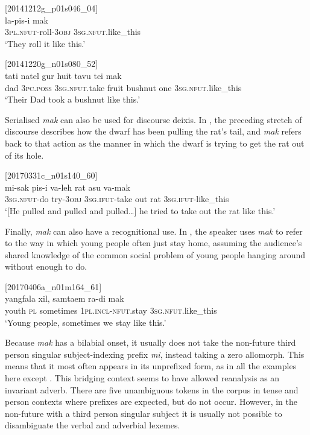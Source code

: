 \documentclass[output=paper,colorlinks,citecolor=brown]{langscibook}
\begin{document}
\ea
{\label{ex:ridge:57}[20141212g\_p01s046\_04]}\\
\gll la-pis-i      mak\\
     \textsc{3pl.nfut-}roll-\textsc{3obj}  \textsc{3sg.nfut.}like\_this\\
\glt ‘They roll it like this.’
\z

\ea
{\label{ex:ridge:58}[20141220g\_n01s080\_52]}\\
\gll tati  natel    gur      huit  tavu    tei  mak\\
     dad   \textsc{3pc.poss}   \textsc{3sg.nfut.}take   fruit   bushnut one   \textsc{3sg.nfut}.like\_this\\
\glt ‘Their Dad took a bushnut like this.’
\z

Serialised \textit{mak} can also be used for discourse deixis. In , the preceding stretch of discourse describes how the dwarf has been pulling the rat’s tail, and \textit{mak} refers back to that action as the manner in which the dwarf is trying to get the rat out of its hole.

\ea
{\label{ex:ridge:59}[20170331c\_n01s140\_60]}\\
\gll mi-sak    pis-i    va-leh      rat  asu  va-mak\\
     \textsc{3sg.nfut}{}-do   try-\textsc{3obj}   \textsc{3sg.ifut-}take   out   rat \textsc{3sg.ifut-}like\_this\\
\glt ‘[He pulled and pulled and pulled…] he tried to take out the rat like this.’
\z

Finally, \textit{mak} can also have a recognitional use. In , the speaker uses \textit{mak} to refer to the way in which young people often just stay home, assuming the audience’s shared knowledge of the common social problem of young people hanging around without enough to do.

\ea
{\label{ex:ridge:60}[20170406a\_n01m164\_61]}\\
\gll yangfala    xil,  samtaem  ra-di      mak\\
     youth     \textsc{pl}   sometimes   \textsc{1pl.incl-nfut.}stay \textsc{3sg.nfut.}like\_this\\
\glt ‘Young people, sometimes we stay like this.’
\z

Because \textit{mak} has a bilabial onset, it usually does not take the non-future third person singular subject-indexing prefix \textit{mi}, instead taking a zero allomorph. This means that it most often appears in its unprefixed form, as in all the examples here except . This bridging context seems to have allowed reanalysis as an invariant adverb. There are five unambiguous tokens in the corpus in tense and person contexts where prefixes are expected, but do not occur. However, in the non-future with a third person singular subject it is usually not possible to disambiguate the verbal and adverbial lexemes.
\end{document}
